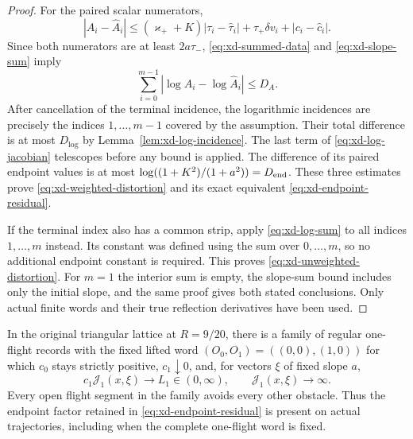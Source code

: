 \begin{proof}
For the paired scalar numerators,
\[
 |A_i-\widehat A_i|
 \le(\varkappa_++K)|\tau_i-\widehat\tau_i|
      +\tau_+\delta v_i+|c_i-\widehat c_i|.
\]
Since both numerators are at least $2a\tau_-$,
\eqref{eq:xd-summed-data} and \eqref{eq:xd-slope-sum} imply
\begin{equation}\label{eq:xd-numerator-sum}
          \sum_{i=0}^{m-1}|\log A_i-\log\widehat A_i|\le D_A.
\end{equation}
After cancellation of the terminal incidence, the logarithmic
incidences are precisely the indices $1,\ldots,m-1$ covered by the
assumption.  Their total difference is at most $D_{\log}$ by
Lemma~\ref{lem:xd-log-incidence}.
The last term of \eqref{eq:xd-log-jacobian} telescopes before any
bound is applied.  The difference of its paired endpoint values
is at most
$\log((1+K^2)/(1+a^2))=D_{\rm end}$.
These three estimates prove \eqref{eq:xd-weighted-distortion} and
its exact equivalent \eqref{eq:xd-endpoint-residual}.

If the terminal index also has a common strip, apply
\eqref{eq:xd-log-sum} to all indices $1,\ldots,m$ instead.
Its constant was defined using the sum over $0,\ldots,m$, so no
additional endpoint constant is required.  This proves
\eqref{eq:xd-unweighted-distortion}.  For $m=1$ the interior sum is
empty, the slope-sum bound includes only the initial slope, and the
same proof gives both stated conclusions.  Only actual finite words
and their true reflection derivatives have been used.
\end{proof}

\begin{lemma}
\label{lem:xd-physical-terminal-limit}
In the original triangular lattice at $R=9/20$, there is a family
of regular one-flight records with the fixed lifted word
$(O_0,O_1)=((0,0),(1,0))$ for which $c_0$ stays strictly positive,
$c_1\downarrow0$, and, for vectors $\xi$ of fixed slope $a$,
\begin{equation}\label{eq:xd-physical-terminal-limit}
 c_1\mathcal J_1(x,\xi)\longrightarrow L_1\in(0,\infty),
 \qquad \mathcal J_1(x,\xi)\longrightarrow\infty.
\end{equation}
Every open flight segment in the family avoids every other obstacle.
Thus the endpoint factor retained in
\eqref{eq:xd-endpoint-residual} is present on actual trajectories,
including when the complete one-flight word is fixed.
\end{lemma}

